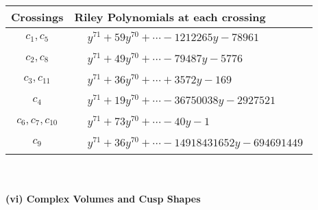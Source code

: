 \documentclass[1p]{elsarticle_modified}
\theoremstyle{definition}
\begin{document}
\begin{tabular}{m{50pt}|m{274pt}}
Crossings & \hspace{64pt}Riley Polynomials at each crossing \\
\hline $$\begin{aligned}c_{1},c_{5}\end{aligned}$$&$\begin{aligned}
&y^{71}+59 y^{70}+\cdots-1212265 y-78961
\end{aligned}$\\
\hline $$\begin{aligned}c_{2},c_{8}\end{aligned}$$&$\begin{aligned}
&y^{71}+49 y^{70}+\cdots-79487 y-5776
\end{aligned}$\\
\hline $$\begin{aligned}c_{3},c_{11}\end{aligned}$$&$\begin{aligned}
&y^{71}+36 y^{70}+\cdots+3572 y-169
\end{aligned}$\\
\hline $$\begin{aligned}c_{4}\end{aligned}$$&$\begin{aligned}
&y^{71}+19 y^{70}+\cdots-36750038 y-2927521
\end{aligned}$\\
\hline $$\begin{aligned}c_{6},c_{7},c_{10}\end{aligned}$$&$\begin{aligned}
&y^{71}+73 y^{70}+\cdots-40 y-1
\end{aligned}$\\
\hline $$\begin{aligned}c_{9}\end{aligned}$$&$\begin{aligned}
&y^{71}+36 y^{70}+\cdots-14918431652 y-694691449
\end{aligned}$\\
\hline
\end{tabular}\\~\\
\newpage\flushleft \textbf{(vi) Complex Volumes and Cusp Shapes}
\end{document}
